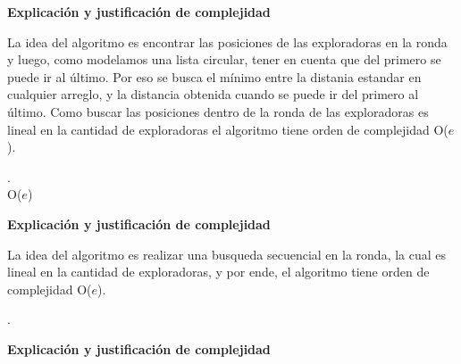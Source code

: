 \documentclass[11pt]{article}
\begin{document}
\begin{center}
\textbf{Explicación y justificación de complejidad} \\ 
\end{center} 

La idea del algoritmo es encontrar las posiciones de las exploradoras en la ronda y luego, como modelamos 
una lista circular, tener en cuenta que del primero se puede ir al último. Por eso se busca el mínimo entre
la distania estandar en cualquier arreglo, y la distancia obtenida cuando se puede ir del primero al último.
Como buscar las posiciones dentro de la ronda de las exploradoras es lineal en la cantidad de exploradoras 
el algoritmo tiene orden de complejidad O($e$).

\noindent\makebox[\linewidth]{\rule{17cm}{0.4pt}}
.\\
 {O($e$)}

\vspace{3mm}
\begin{center}
\textbf{Explicación y justificación de complejidad} \\ 
\end{center} 

La idea del algoritmo es realizar una busqueda secuencial en la ronda, la cual es lineal en la cantidad de 
exploradoras, y por ende, el algoritmo tiene orden de complejidad O($e$).

\noindent\makebox[\linewidth]{\rule{17cm}{0.4pt}}
.\\

\vspace{3mm}
\begin{center}
\textbf{Explicación y justificación de complejidad} \\ 
\end{center} 
\end{document}
